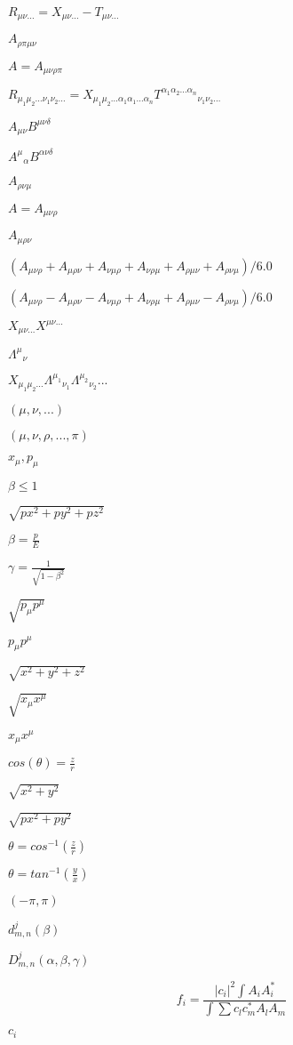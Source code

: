 \documentclass{article}
\begin{document}
$ R_{\mu\nu\ldots} = X_{\mu\nu\ldots} - T_{\mu\nu\ldots} $
\pagebreak

$ A_{\rho\pi\mu\nu} $
\pagebreak

$ A = A_{\mu\nu\rho\pi} $
\pagebreak

$ R_{\mu_1\mu_2\ldots\nu_1\nu_2\ldots} = X_{\mu_1\mu_2\ldots\alpha_1\alpha_1\ldots\alpha_n} T^{\alpha_1\alpha_2\ldots\alpha_n}{}_{\nu_1\nu_2\ldots} $
\pagebreak

$ A_{\mu\nu} B^{\mu\nu\delta} $
\pagebreak

$ A^{\mu}{}_{\alpha} B^{\alpha\nu\delta} $
\pagebreak

$ A_{\rho\nu\mu} $
\pagebreak

$ A = A_{\mu\nu\rho} $
\pagebreak

$ A_{\mu\rho\nu} $
\pagebreak

$ (A_{\mu\nu\rho} + A_{\mu\rho\nu} + A_{\nu\mu\rho} + A_{\nu\rho\mu} + A_{\rho\mu\nu} + A_{\rho\nu\mu})/6.0 $
\pagebreak

$ (A_{\mu\nu\rho} - A_{\mu\rho\nu} - A_{\nu\mu\rho} + A_{\nu\rho\mu} + A_{\rho\mu\nu} - A_{\rho\nu\mu})/6.0 $
\pagebreak

$ X_{\mu\nu...} X^{\mu\nu...} $
\pagebreak

$ \Lambda^{\mu}{}_{\nu}$
\pagebreak

$ X_{\mu_1 \mu_2 ...} \Lambda^{\mu_1}{}_{\nu_1} \Lambda^{\mu_2}{}_{\nu_2} ... $
\pagebreak

$(\mu,\nu,...)$
\pagebreak

$ (\mu,\nu,\rho,...,\pi) $
\pagebreak

$ x_{\mu}, p_{\mu} $
\pagebreak

$ \beta \leq 1 $
\pagebreak

$\sqrt{px^2 + py^2 + pz^2}$
\pagebreak

$ \beta = \frac{p}{E} $
\pagebreak

$ \gamma = \frac{1}{\sqrt{1 - \beta^2}} $
\pagebreak

$ \sqrt{p_{\mu} p^{\mu}} $
\pagebreak

$ p_{\mu} p^{\mu} $
\pagebreak

$\sqrt{x^2 + y^2 + z^2}$
\pagebreak

$ \sqrt{x_{\mu} x^{\mu}} $
\pagebreak

$ x_{\mu} x^{\mu} $
\pagebreak

$ cos(\theta) = \frac{z}{r} $
\pagebreak

$\sqrt{x^2 + y^2}$
\pagebreak

$\sqrt{px^2 + py^2}$
\pagebreak

$ \theta = cos^{-1}(\frac{z}{r}) $
\pagebreak

$ \theta = tan^{-1}(\frac{y}{x}) $
\pagebreak

$ (-\pi,\pi) $
\pagebreak

$d^{j}_{m,n}(\beta)$
\pagebreak

$D^{j}_{m,n}(\alpha,\beta,\gamma)$
\pagebreak

\[ f_i = \frac{|c_i|^2 \int A_i A_i^*}{\int \sum c_l c_m^* A_l A_m} \]
\pagebreak

$c_i$
\pagebreak
\end{document}
